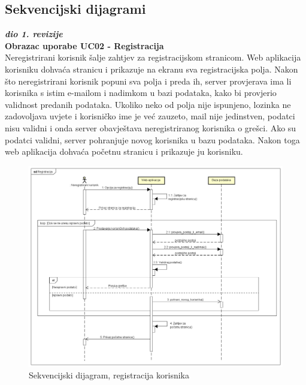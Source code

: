 			\subsection{Sekvencijski dijagrami}
				
				\textbf{\textit{dio 1. revizije}}\\
				
				\textbf{Obrazac uporabe UC02 - Registracija}\\
				
				Neregistrirani korisnik šalje zahtjev za registracijskom stranicom. Web aplikacija korisniku dohvaća stranicu i prikazuje na ekranu sva registracijska polja. Nakon što neregistrirani korisnik popuni sva polja i preda ih, server provjerava ima li korisnika s istim e-mailom i nadimkom u bazi podataka, kako bi provjerio validnost predanih podataka. Ukoliko neko od polja nije ispunjeno, lozinka ne zadovoljava uvjete i korisničko ime je već zauzeto, mail nije jedinstven, podatci nisu validni i onda server obavještava neregistriranog korisnika o grešci. Ako su podatci validni, server pohranjuje novog korisnika u bazu podataka. Nakon toga web aplikacija dohvaća početnu stranicu i prikazuje ju korisniku.
				
				\begin{figure}[H]
					\includegraphics[width=\textwidth]{dijagrami/SeqDiagram1.PNG} 
					\caption{Sekvencijski dijagram, registracija korisnika}
					\label{fig:SeqDiagram1}
				\end{figure}
				
				\eject

